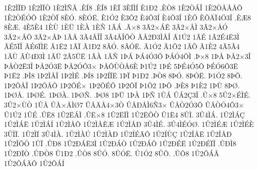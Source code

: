 {1^^c82^^cc^^cf^^d0
1^^c82^^cc^^cf^^d2
1^^c82^^cc^^d1^^c2
.^^c8^^cd8
.^^c8^^ce8
1^^c8^^cf
3^^c8^^cf^^cc^^cd
^^c81^^d02
.^^c8^^d28
1^^c82^^d2^^c1^^ce
1^^c82^^d2^^c5^^c2^^c5^^d4
1^^c82^^d2^^c9^^d3^^d4
1^^c82^^d2^^cf
8^^c8^^d3.
8^^c8^^d3^^cb.
^^c81^^d32
^^c83^^d42
^^c84^^d43^^cd
^^c84^^d43^^ce
1^^c8^^d5
^^c8^^d5^^c4^^cf4^^d63^^ce
.^^c8^^c68
8^^c8^^c6.
4^^c85^^c84
1^^c8^^d9
1^^c8^^dc
1^^c8^^c0
1^^c8^^d1
1^^c3^^c1
.^^c3^^d78
3^^c32^^d7^^c1^^ca
3^^c32^^d7^^c5^^cc
3^^c32^^d7^^c5^^d3
3^^c32^^d7^^c5^^d4
3^^c32^^d7^^c5^^de
1^^c3^^c5
3^^c34^^c5^^ce^^ce
3^^c34^^c5^^ce^^d4^^d2
^^c3^^c52^^d03^^cc^^c5^^ce
^^c31^^da2
1^^c3^^c9
1^^c32^^c94^^cb3^^cc
^^c3^^c95^^cf^^ce
^^c3^^c96^^cf^^cc^^cb
^^c31^^cb2
1^^c3^^cf
^^c31^^d02
8^^c3^^d3.
8^^c3^^d3^^cb.
^^c31^^d32
^^c31^^d42
1^^c3^^d5
^^c31^^c82
4^^c35^^c34
1^^c3^^d9
^^c3^^d94^^d03^^cc
1^^c3^^dc
2^^c35^^dc^^cb
1^^c3^^c0
1^^c3^^d1
1^^de^^c1
^^de^^c14^^d33^^d4
^^de^^c1^^d34^^d4^^cc
.^^de^^d78
1^^de^^c5
^^de^^c52^^d73^^ce
^^de^^c5^^d22^^cb3^^ce
^^de^^c52^^d33^^cb
^^de^^c52^^d3^^d43^^d7
^^de^^c5^^d4^^d9^^d2^^c56^^c8
^^de1^^da2
1^^de^^c9
5^^de^^c94^^d35^^d4
^^de^^c9^^d36^^d43^^cb
^^de1^^cb2
.^^de^^cc8
1^^de2^^cc^^c5^^ce
1^^de2^^cc^^c9
.^^de^^cd8
1^^de2^^cd^^cf^^cb
1^^de^^cf
^^de1^^d02
.^^de^^d28
8^^de^^d3.
8^^de^^d3^^cb.
^^de1^^d32
8^^de^^d4.
1^^de2^^d4^^c5^^ce
1^^de2^^d4^^c5^^d4
1^^de2^^d4^^c9^^d7
1^^de2^^d4^^c9^^d4
1^^de2^^d4^^cf
^^de1^^d42
1^^de^^d5
.^^de^^c88
^^de1^^c82
1^^de^^d9
8^^de^^d8.
1^^de^^d8^^c5.
1^^de^^d8^^c9.
1^^de^^d8^^c0.
1^^de^^d8^^d1.
.^^de^^d88
1^^de^^dc
1^^de^^c0
1^^de^^d1
1^^db^^c1
^^db^^c12^^c73^^ce
.^^db^^d78
5^^db2^^d7^^c9^^cc^^c9.
3^^db2^^d7^^d9^^d2
1^^db^^c5
^^db^^c5^^d7^^c5^^cc^^d87
^^db^^c5^^c4^^c54^^d73^^d2
^^db^^c5^^d0^^c5^^cc6^^d13^^d7
^^db^^c5^^d22^^d33^^d4
^^db^^c5^^d2^^d34^^d43^^d7
^^db1^^da2
1^^db^^c9
.^^db^^cb8
1^^db2^^cb^^c1^^cc
.^^db^^cb^^d78
1^^db2^^cb^^cf^^cc
1^^db2^^cb^^d5^^d2
^^db1^^cb4
8^^db^^cc.
3^^db4^^cc^^c1.
1^^db2^^cc^^c1^^c7
1^^db2^^cc^^c1^^cb
1^^db2^^cc^^c1^^cd
1^^db2^^cc^^c5^^d4
1^^db2^^cc^^c5^^ca^^c6
1^^db2^^cc^^c5^^d0
3^^db4^^cc^^c9.
3^^db4^^cc^^c9^^d3^^d8.
1^^db2^^cc^^c9^^c6
1^^db2^^cc^^c9^^c8
3^^db^^cc^^cf.
1^^db2^^cc^^cf
3^^db4^^cc^^c0.
1^^db2^^cc^^c0^^da
1^^db2^^cc^^c0^^d0
1^^db2^^cd^^c9^^c4^^d4
1^^db2^^cd^^d9^^c7
1^^db2^^ce^^c5^^cb
1^^db2^^ce^^c5^^d0
1^^db2^^ce^^d5^^d2
1^^db^^cf
.^^db^^d08
1^^db2^^d0^^c1^^cb3^^cc
1^^db2^^d0^^c1^^d2
1^^db2^^d0^^c1^^d4
1^^db2^^d0^^c9^^cb
1^^db2^^d0^^c9^^cf^^ce
.^^db^^d0^^cc8
1^^db2^^d0^^cf^^d2
.^^db^^d0^^d28
^^db1^^d02
.^^db^^d28
8^^db^^d3.
8^^db^^d3^^cb.
^^db1^^d32
8^^db^^d4.
.^^db^^d48
1^^db2^^d4^^c1^^c2
1^^db2^^d4^^c1^^c4^^d4
1^^db2^^d4^^c1^^cd
}

